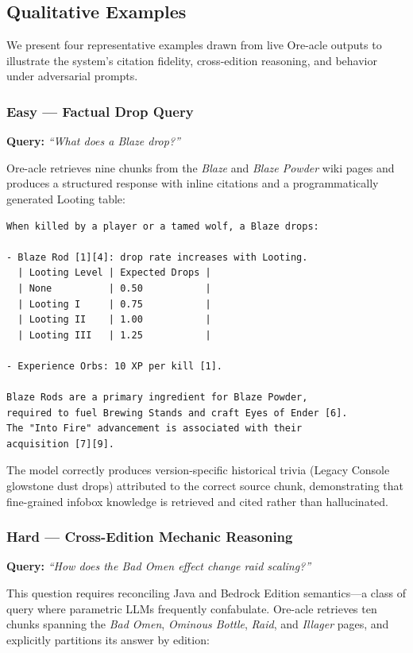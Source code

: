 \documentclass[11pt,a4paper]{article}
\begin{document}
\subsection{Qualitative Examples}
\label{sec:qualitative}

We present four representative examples drawn from live Ore-acle outputs to illustrate the system's citation fidelity, cross-edition reasoning, and behavior under adversarial prompts.

\subsubsection*{Easy --- Factual Drop Query}

\textbf{Query:} \textit{``What does a Blaze drop?''}

Ore-acle retrieves nine chunks from the \textit{Blaze} and \textit{Blaze Powder} wiki pages and produces a structured response with inline citations and a programmatically generated Looting table:

\begin{lstlisting}
When killed by a player or a tamed wolf, a Blaze drops:

- Blaze Rod [1][4]: drop rate increases with Looting.
  | Looting Level | Expected Drops |
  | None          | 0.50           |
  | Looting I     | 0.75           |
  | Looting II    | 1.00           |
  | Looting III   | 1.25           |

- Experience Orbs: 10 XP per kill [1].

Blaze Rods are a primary ingredient for Blaze Powder,
required to fuel Brewing Stands and craft Eyes of Ender [6].
The "Into Fire" advancement is associated with their
acquisition [7][9].
\end{lstlisting}

\noindent The model correctly produces version-specific historical trivia (Legacy Console glowstone dust drops) attributed to the correct source chunk, demonstrating that fine-grained infobox knowledge is retrieved and cited rather than hallucinated.

\subsubsection*{Hard --- Cross-Edition Mechanic Reasoning}

\textbf{Query:} \textit{``How does the Bad Omen effect change raid scaling?''}

This question requires reconciling Java and Bedrock Edition semantics---a class of query where parametric LLMs frequently confabulate. Ore-acle retrieves ten chunks spanning the \textit{Bad Omen}, \textit{Ominous Bottle}, \textit{Raid}, and \textit{Illager} pages, and explicitly partitions its answer by edition:
\end{document}
